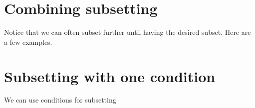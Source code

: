 \documentclass[]{book}
\newenvironment{Shaded}{}{}
\newcommand{\CommentTok}[1]{\textcolor[rgb]{0.38,0.63,0.69}{\textit{#1}}}
\newcommand{\DecValTok}[1]{\textcolor[rgb]{0.25,0.63,0.44}{#1}}
\newcommand{\NormalTok}[1]{#1}
\newcommand{\OperatorTok}[1]{\textcolor[rgb]{0.40,0.40,0.40}{#1}}
\newcommand{\StringTok}[1]{\textcolor[rgb]{0.25,0.44,0.63}{#1}}
\theoremstyle{definition}
\theoremstyle{definition}
\theoremstyle{definition}
\theoremstyle{remark}
\begin{document}
\hypertarget{combining-subsetting}{%
\section{Combining subsetting}\label{combining-subsetting}}

Notice that we can often subset further until having the desired subset.
Here are a few examples.

\begin{Shaded}
\end{Shaded}

\hypertarget{subsetting-with-one-condition}{%
\section{Subsetting with one
condition}\label{subsetting-with-one-condition}}

We can use conditions for subsetting
\end{document}
